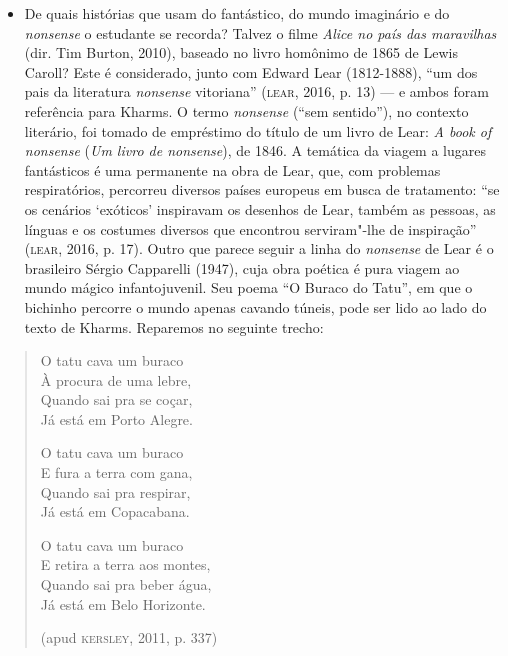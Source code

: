 \documentclass[11pt]{extarticle}
\begin{document}
\begin{itemize}
\item De quais histórias que usam do fantástico, do mundo imaginário e do
\emph{nonsense} o estudante se recorda? Talvez o filme \emph{Alice no
país das maravilhas} (dir. Tim Burton, 2010), baseado no livro homônimo
de 1865 de Lewis Caroll? Este é considerado, junto com Edward Lear
(1812-1888), ``um dos pais da literatura \emph{nonsense} vitoriana''
(\textsc{lear}, 2016, p. 13) --- e ambos foram referência para Kharms. O termo
\emph{nonsense} (``sem sentido''), no contexto literário, foi tomado de
empréstimo do título de um livro de Lear: \emph{A book of nonsense}
(\emph{Um livro de nonsense}), de 1846. A temática da viagem a lugares
fantásticos é uma permanente na obra de Lear, que, com problemas
respiratórios, percorreu diversos países europeus em busca de
tratamento: ``se os cenários `exóticos' inspiravam os desenhos de Lear,
também as pessoas, as línguas e os costumes diversos que encontrou
serviram"-lhe de inspiração'' (\textsc{lear}, 2016, p. 17). Outro que parece
seguir a linha do \emph{nonsense} de Lear é o brasileiro Sérgio
Capparelli (1947), cuja obra poética é pura viagem ao mundo mágico
infantojuvenil. Seu poema ``O Buraco do Tatu'', em que o bichinho
percorre o mundo apenas cavando túneis, pode ser lido ao lado do texto
de Kharms. Reparemos no seguinte trecho:
\end{itemize}

\begin{verse}
O tatu cava um buraco\\
À procura de uma lebre,\\
Quando sai pra se coçar,\\
Já está em Porto Alegre.

O tatu cava um buraco\\
E fura a terra com gana,\\
Quando sai pra respirar,\\
Já está em Copacabana.

O tatu cava um buraco\\
E retira a terra aos montes,\\
Quando sai pra beber água,\\
Já está em Belo Horizonte.

(apud \textsc{kersley}, 2011, p. 337)
\end{verse}


\end{document}
